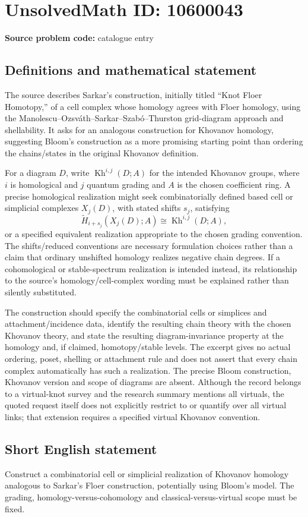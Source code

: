 \documentclass[11pt]{article}
\begin{document}
\section*{UnsolvedMath ID: 10600043}
\textbf{Source problem code:} catalogue entry
\subsection{Definitions and mathematical statement}
The source describes Sarkar's construction, initially titled ``Knot Floer Homotopy,'' of a cell complex whose homology agrees with Floer homology, using the Manolescu--Ozsv\'ath--Sarkar--Szab\'o--Thurston grid-diagram approach and shellability. It asks for an analogous construction for Khovanov homology, suggesting Bloom's construction as a more promising starting point than ordering the chains/states in the original Khovanov definition.

For a diagram \(D\), write \(\operatorname{Kh}^{i,j}(D;A)\) for the intended Khovanov groups, where \(i\) is homological and \(j\) quantum grading and \(A\) is the chosen coefficient ring. A precise homological realization might seek combinatorially defined based cell or simplicial complexes \(X_j(D)\), with stated shifts \(s_j\), satisfying
\[\widetilde H_{i+s_j}(X_j(D);A)\cong\operatorname{Kh}^{i,j}(D;A),\]
or a specified equivalent realization appropriate to the chosen grading convention. The shifts/reduced conventions are necessary formulation choices rather than a claim that ordinary unshifted homology realizes negative chain degrees. If a cohomological or stable-spectrum realization is intended instead, its relationship to the source's homology/cell-complex wording must be explained rather than silently substituted.

The construction should specify the combinatorial cells or simplices and attachment/incidence data, identify the resulting chain theory with the chosen Khovanov theory, and state the resulting diagram-invariance property at the homology and, if claimed, homotopy/stable levels. The excerpt gives no actual ordering, poset, shelling or attachment rule and does not assert that every chain complex automatically has such a realization. The precise Bloom construction, Khovanov version and scope of diagrams are absent. Although the record belongs to a virtual-knot survey and the research summary mentions all virtuals, the quoted request itself does not explicitly restrict to or quantify over all virtual links; that extension requires a specified virtual Khovanov convention.
\subsection{Short English statement}
Construct a combinatorial cell or simplicial realization of Khovanov homology analogous to Sarkar's Floer construction, potentially using Bloom's model. The grading, homology-versus-cohomology and classical-versus-virtual scope must be fixed.
\end{document}
